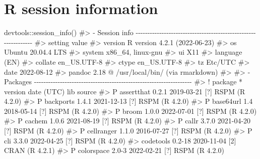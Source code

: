 \documentclass[
  11pt,
  letterpaper,
  DIV=11,
  numbers=noendperiod]{scrartcl}
\newenvironment{Shaded}{}{}
\newcommand{\CommentTok}[1]{\textcolor[rgb]{0.42,0.45,0.49}{#1}}
\newcommand{\FunctionTok}[1]{\textcolor[rgb]{0.44,0.26,0.76}{#1}}
\newcommand{\NormalTok}[1]{\textcolor[rgb]{0.14,0.16,0.18}{#1}}
\newcommand{\SpecialCharTok}[1]{\textcolor[rgb]{0.00,0.36,0.77}{#1}}
\begin{document}
\hypertarget{r-session-information}{%
\section{R session information}\label{r-session-information}}

\begin{Shaded}
\begin{Highlighting}[]
\NormalTok{devtools}\SpecialCharTok{::}\FunctionTok{session\_info}\NormalTok{()}
\CommentTok{\#\textgreater{} {-} Session info {-}{-}{-}{-}{-}{-}{-}{-}{-}{-}{-}{-}{-}{-}{-}{-}{-}{-}{-}{-}{-}{-}{-}{-}{-}{-}{-}{-}{-}{-}{-}{-}{-}{-}{-}{-}{-}{-}{-}{-}{-}{-}{-}{-}{-}{-}{-}{-}{-}{-}{-}{-}{-}{-}{-}{-}{-}{-}{-}{-}{-}{-}{-}}
\CommentTok{\#\textgreater{}  setting  value}
\CommentTok{\#\textgreater{}  version  R version 4.2.1 (2022{-}06{-}23)}
\CommentTok{\#\textgreater{}  os       Ubuntu 20.04.4 LTS}
\CommentTok{\#\textgreater{}  system   x86\_64, linux{-}gnu}
\CommentTok{\#\textgreater{}  ui       X11}
\CommentTok{\#\textgreater{}  language (EN)}
\CommentTok{\#\textgreater{}  collate  en\_US.UTF{-}8}
\CommentTok{\#\textgreater{}  ctype    en\_US.UTF{-}8}
\CommentTok{\#\textgreater{}  tz       Etc/UTC}
\CommentTok{\#\textgreater{}  date     2022{-}08{-}12}
\CommentTok{\#\textgreater{}  pandoc   2.18 @ /usr/local/bin/ (via rmarkdown)}
\CommentTok{\#\textgreater{} }
\CommentTok{\#\textgreater{} {-} Packages {-}{-}{-}{-}{-}{-}{-}{-}{-}{-}{-}{-}{-}{-}{-}{-}{-}{-}{-}{-}{-}{-}{-}{-}{-}{-}{-}{-}{-}{-}{-}{-}{-}{-}{-}{-}{-}{-}{-}{-}{-}{-}{-}{-}{-}{-}{-}{-}{-}{-}{-}{-}{-}{-}{-}{-}{-}{-}{-}{-}{-}{-}{-}{-}{-}{-}{-}}
\CommentTok{\#\textgreater{}  ! package     * version date (UTC) lib source}
\CommentTok{\#\textgreater{}  P assertthat    0.2.1   2019{-}03{-}21 [?] RSPM (R 4.2.0)}
\CommentTok{\#\textgreater{}  P backports     1.4.1   2021{-}12{-}13 [?] RSPM (R 4.2.0)}
\CommentTok{\#\textgreater{}  P base64url     1.4     2018{-}05{-}14 [?] RSPM (R 4.2.0)}
\CommentTok{\#\textgreater{}  P broom         1.0.0   2022{-}07{-}01 [?] RSPM (R 4.2.0)}
\CommentTok{\#\textgreater{}  P cachem        1.0.6   2021{-}08{-}19 [?] RSPM (R 4.2.0)}
\CommentTok{\#\textgreater{}  P callr         3.7.0   2021{-}04{-}20 [?] RSPM (R 4.2.0)}
\CommentTok{\#\textgreater{}  P cellranger    1.1.0   2016{-}07{-}27 [?] RSPM (R 4.2.0)}
\CommentTok{\#\textgreater{}  P cli           3.3.0   2022{-}04{-}25 [?] RSPM (R 4.2.0)}
\CommentTok{\#\textgreater{}    codetools     0.2{-}18  2020{-}11{-}04 [2] CRAN (R 4.2.1)}
\CommentTok{\#\textgreater{}  P colorspace    2.0{-}3   2022{-}02{-}21 [?] RSPM (R 4.2.0)}

\end{Highlighting}
\end{Shaded}
\end{document}
